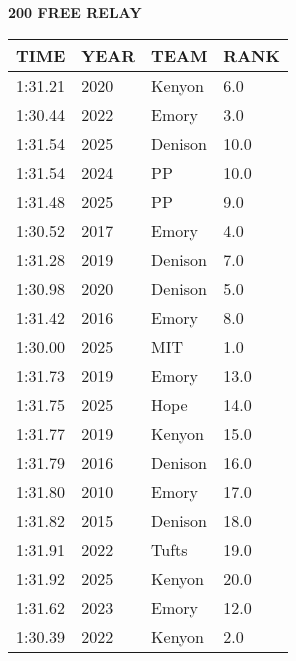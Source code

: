 \begin{center}
\begin{minipage}[t]{0.7\textwidth}
\centering
\textbf{200 FREE RELAY}\\[0.05cm]
\begin{tabular}{@{}p{1.8cm}p{1.2cm}p{1.4cm}p{0.8cm}@{}}
\hline
\textbf{TIME} & \textbf{YEAR} & \textbf{TEAM} & \textbf{RANK} \\
\hline
1:31.21 & 2020 & Kenyon & 6.0 \\
1:30.44 & 2022 & Emory & 3.0 \\
1:31.54 & 2025 & Denison & 10.0 \\
1:31.54 & 2024 & PP & 10.0 \\
1:31.48 & 2025 & PP & 9.0 \\
1:30.52 & 2017 & Emory & 4.0 \\
1:31.28 & 2019 & Denison & 7.0 \\
1:30.98 & 2020 & Denison & 5.0 \\
1:31.42 & 2016 & Emory & 8.0 \\
1:30.00 & 2025 & MIT & 1.0 \\
1:31.73 & 2019 & Emory & 13.0 \\
1:31.75 & 2025 & Hope & 14.0 \\
1:31.77 & 2019 & Kenyon & 15.0 \\
1:31.79 & 2016 & Denison & 16.0 \\
1:31.80 & 2010 & Emory & 17.0 \\
1:31.82 & 2015 & Denison & 18.0 \\
1:31.91 & 2022 & Tufts & 19.0 \\
1:31.92 & 2025 & Kenyon & 20.0 \\
1:31.62 & 2023 & Emory & 12.0 \\
1:30.39 & 2022 & Kenyon & 2.0 \\
\hline
\end{tabular}
\end{minipage}
\end{center}

\vspace{0.4cm}

